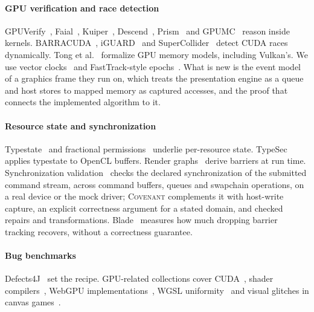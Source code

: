 \documentclass[acmtog,anonymous,review]{acmart}
\newcommand{\sys}{\textsc{Covenant}\xspace}
\begin{document}
\paragraph{GPU verification and race detection}
GPUVerify~\cite{betts2012gpuverify}, Faial~\cite{cogumbreiro2021faial}, Kuiper~\cite{martinez2026kuiper},
Descend~\cite{kopcke2024descend}, Prism~\cite{bansal2026prism} and GPUMC~\cite{gpumc2025} reason inside kernels.
BARRACUDA~\cite{eizenberg2017barracuda}, iGUARD~\cite{kamath2021iguard} and SuperCollider~\cite{supercollider2026}
detect CUDA races dynamically. Tong et al.~\cite{tong2024gpuconsistency} formalize GPU memory models, including
Vulkan's. We use vector clocks~\cite{lamport1978time,mattern1989virtual} and FastTrack-style
epochs~\cite{flanagan2009fasttrack}. What is new is the event model of a graphics frame they run on, which treats the
presentation engine as a queue and host stores to mapped memory as captured accesses, and the proof that connects the
implemented algorithm to it.

\paragraph{Resource state and synchronization}
Typestate~\cite{strom1986typestate,garcia2014typestate,revocable2026typestate} and fractional
permissions~\cite{boyland2003fractional} underlie per-resource state. TypeSec~\cite{bicanic2025typesec} applies
typestate to OpenCL buffers. Render graphs~\cite{odonnell2017framegraph,amd2022rps} derive barriers at run time.
Synchronization validation~\cite{lunarg2021syncval} checks the declared synchronization of the submitted command
stream, across command buffers, queues and swapchain operations, on a real device or the mock driver; \sys
complements it with host-write capture, an explicit correctness argument for a stated domain, and checked repairs
and transformations. Blade~\cite{malyshau2026blade} measures how much dropping barrier tracking recovers, without a
correctness guarantee.

\paragraph{Bug benchmarks}
Defects4J~\cite{just2014defects4j} set the recipe. GPU-related collections cover CUDA~\cite{wu2020simulee,
rathnasuriya2025numerical}, shader compilers~\cite{donaldson2017graphicsfuzz,xiao2025shadiv}, WebGPU
implementations~\cite{wong2025webglitch}, WGSL uniformity~\cite{leejones2026uniformity} and visual glitches in canvas
games~\cite{macklon2022canvas}.
\end{document}
